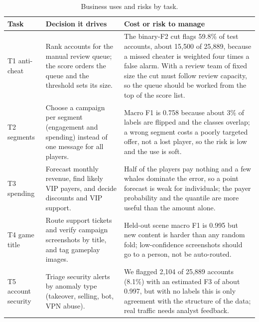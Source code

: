 \begin{table}[H]\centering\scriptsize
\captionsetup{justification=raggedright,singlelinecheck=false}

\begin{tabular}{@{}L{.12\linewidth}L{.40\linewidth}L{.40\linewidth}@{}}
\toprule
\textbf{Task} & \textbf{Decision it drives} & \textbf{Cost or risk to manage} \\
\midrule
T1 anti-cheat & Rank accounts for the manual review queue; the score orders the queue and the threshold sets its size. & The binary-F2 cut flags 59.8\% of test accounts, about 15,500 of 25,889, because a missed cheater is weighted four times a false alarm. With a review team of fixed size the cut must follow review capacity, so the queue should be worked from the top of the score list. \\
T2 segments & Choose a campaign per segment (engagement and spending) instead of one message for all players. & Macro F1 is 0.758 because about 3\% of labels are flipped and the classes overlap; a wrong segment costs a poorly targeted offer, not a lost player, so the risk is low and the use is soft. \\
T3 spending & Forecast monthly revenue, find likely VIP payers, and decide discounts and VIP support. & Half of the players pay nothing and a few whales dominate the error, so a point forecast is weak for individuals; the payer probability and the quantile are more useful than the amount alone. \\
T4 game title & Route support tickets and verify campaign screenshots by title, and tag gameplay images. & Held-out scene macro F1 is 0.995 but new content is harder than any random fold; low-confidence screenshots should go to a person, not be auto-routed. \\
T5 account security & Triage security alerts by anomaly type (takeover, selling, bot, VPN abuse). & We flagged 2,104 of 25,889 accounts (8.1\%) with an estimated F3 of about 0.997, but with no labels this is only agreement with the structure of the data; real traffic needs analyst feedback. \\
\bottomrule
\end{tabular}
\caption{Business uses and risks by task.}\label{tab:concl-business}
\end{table}

